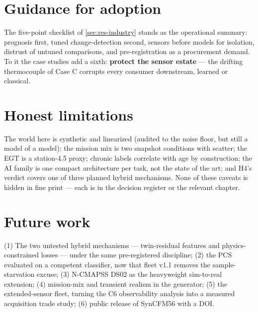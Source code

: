\section{Guidance for adoption}

The five-point checklist of \cref{sec:res-industry} stands as the operational summary:
prognosis first, tuned change-detection second, sensors before models for isolation,
distrust of untuned comparisons, and pre-registration as a procurement demand. To it the
case studies add a sixth: \textbf{protect the sensor estate} --- the drifting thermocouple
of Case C corrupts every consumer downstream, learned or classical.

\section{Honest limitations}

The world here is synthetic and linearized (audited to the noise floor, but still a model
of a model); the mission mix is two snapshot conditions with scatter; the EGT is a
station-4.5 proxy; chronic labels correlate with age by construction; the AI family is one
compact architecture per task, not the state of the art; and H4's verdict covers one of
three planned hybrid mechanisms. None of these caveats is hidden in fine print --- each is
in the decision register or the relevant chapter.

\section{Future work}

(1) The two untested hybrid mechanisms --- twin-residual features and physics-constrained
losses --- under the same pre-registered discipline; (2) the PCS evaluated on a competent
classifier, now that fleet v1.1 removes the sample-starvation excuse; (3) N-CMAPSS DS02 as
the heavyweight sim-to-real extension; (4) mission-mix and transient realism in the
generator; (5) the extended-sensor fleet, turning the C6 observability analysis into a
measured acquisition trade study; (6) public release of SynCFM56 with a DOI.
